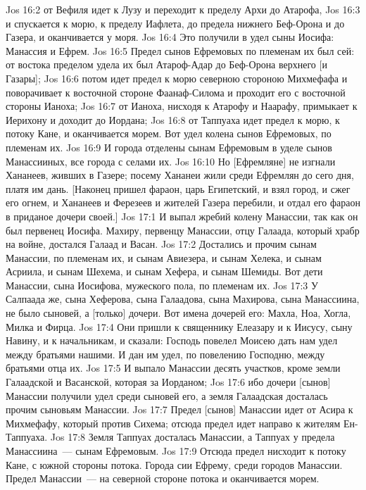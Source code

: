 \vs Jos 16:2 от Вефиля идет  к Лузу и переходит к пределу Архи до Атарофа,
\vs Jos 16:3 и спускается к морю, к пределу Иафлета, до предела нижнего Беф-Орона и до Газера, и оканчивается у моря.
\vs Jos 16:4 Это получили в удел сыны Иосифа: Манассия и Ефрем.
\rsbpar\vs Jos 16:5 Предел сынов Ефремовых по племенам их был сей: от востока пределом удела их был Атароф-Адар до Беф-Орона верхнего [и Газары];
\vs Jos 16:6 потом идет предел к морю северною стороною Михмефафа и поворачивает к восточной стороне Фаанаф-Силома и проходит его с восточной стороны Ианоха;
\vs Jos 16:7 от Ианоха, нисходя к Атарофу и Наарафу, примыкает к Иерихону и доходит до Иордана;
\vs Jos 16:8 от Таппуаха идет предел к морю, к потоку Кане, и оканчивается морем. Вот удел колена сынов Ефремовых, по племенам их.
\vs Jos 16:9 И города отделены сынам Ефремовым в уделе сынов Манассииных, все города с селами их.
\vs Jos 16:10 Но [Ефремляне] не изгнали Хананеев, живших в Газере; посему Хананеи жили среди Ефремлян до сего дня, платя им дань. [Наконец пришел фараон, царь Египетский, и взял город, и сжег его огнем, и Хананеев и Ферезеев и жителей Газера перебили, и отдал его фараон в приданое дочери своей.]
\vs Jos 17:1 И выпал жребий колену Манассии, так как он был первенец Иосифа. Махиру, первенцу Манассии, отцу Галаада, который  храбр на войне, достался Галаад и Васан.
\vs Jos 17:2 Достались  и прочим сынам Манассии, по племенам их, и сынам Авиезера, и сынам Хелека, и сынам Асриила, и сынам Шехема, и сынам Хефера, и сынам Шемиды. Вот дети Манассии, сына Иосифова, мужеского пола, по племенам их.
\vs Jos 17:3 У Салпаада же, сына Хеферова, сына Галаадова, сына Махирова, сына Манассиина, не было сыновей, а [только] дочери. Вот имена дочерей его: Махла, Ноа, Хогла, Милка и Фирца.
\vs Jos 17:4 Они пришли к священнику Елеазару и к Иисусу, сыну Навину, и к начальникам, и сказали: Господь повелел Моисею дать нам удел между братьями нашими. И дан им удел, по повелению Господню, между братьями отца их.
\vs Jos 17:5 И выпало Манассии десять участков, кроме земли Галаадской и Васанской, которая за Иорданом;
\vs Jos 17:6 ибо дочери [сынов] Манассии получили удел среди сыновей его, а земля Галаадская досталась прочим сыновьям Манассии.
\vs Jos 17:7 Предел [сынов] Манассии идет от Асира к Михмефафу, который против Сихема; отсюда предел идет направо к жителям Ен-Таппуаха.
\vs Jos 17:8 Земля Таппуах досталась Манассии, а  Таппуах у предела Манассиина~--- сынам Ефремовым.
\vs Jos 17:9 Отсюда предел нисходит к потоку Кане, с южной стороны потока. Города сии  Ефрему,  среди городов Манассии. Предел Манассии~--- на северной стороне потока и оканчивается морем.
